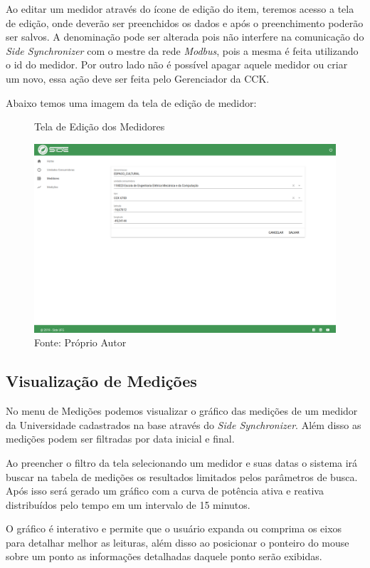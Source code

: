 Ao editar um medidor através do ícone de edição do item, teremos acesso a tela de edição, onde deverão ser preenchidos os dados e após o preenchimento poderão ser salvos. A denominação pode ser alterada pois não interfere na comunicação do \textit{Side Synchronizer} com o mestre da rede \textit{Modbus}, pois a mesma é feita utilizando o id do medidor. Por outro lado não é possível apagar aquele medidor ou criar um novo, essa ação deve ser feita pelo Gerenciador da CCK. 

Abaixo temos uma imagem da tela de edição de medidor:

\begin{figure}[H]
    \centering
    \caption{Tela de Edição dos Medidores}
\includegraphics[width=0.75\linewidth]{imagens/side/side-medidor-edit.png}
    \caption*{Fonte: Próprio Autor}
    \label{fig:side-medidor-edit}
\end{figure}


\subsection{Visualização de Medições}

No menu de Medições podemos visualizar o gráfico das medições de um medidor da Universidade cadastrados na base através do \textit{Side Synchronizer}. Além disso as medições podem ser filtradas por data inicial e final.

Ao preencher o filtro da tela selecionando um medidor e suas datas o sistema irá buscar na tabela de medições os resultados limitados pelos parâmetros de busca. Após isso será gerado um gráfico com a curva de potência ativa e reativa distribuídos pelo tempo em um intervalo de 15 minutos.

O gráfico é interativo e permite que o usuário expanda ou comprima os eixos para detalhar melhor as leituras, além disso ao posicionar o ponteiro do mouse sobre um ponto as informações detalhadas daquele ponto serão exibidas.

